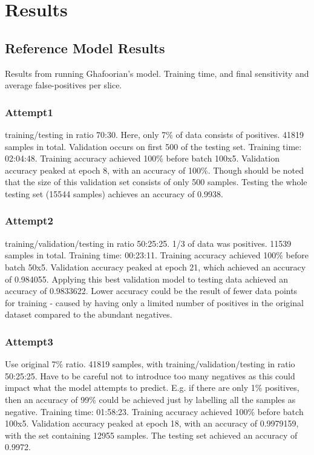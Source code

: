 %
%

\chapter{Results}\label{results}

\citep{AdamsH.H.Hieab2013RMfD}

\section{Reference Model Results}

Results from running Ghafoorian's model. Training time, and final sensitivity and average false-positives per slice.

\subsection*{Attempt1}

training/testing in ratio 70:30. Here, only 7\% of data consists of positives. 41819 samples in total. Validation occurs on first 500 of the testing set. Training time: 02:04:48.
Training accuracy achieved 100\% before batch 100x5. Validation accuracy peaked at epoch 8, with an accuracy of 100\%. Though should be noted that the size of this validation set consists of only 500 samples. Testing the whole testing set (15544 samples) achieves an accuracy of 0.9938.

\subsection*{Attempt2}

training/validation/testing in ratio 50:25:25. 1/3 of data was positives. 11539 samples in total. Training time: 00:23:11.
Training accuracy achieved 100\% before batch 50x5. Validation accuracy peaked at epoch 21, which achieved an accuracy of 0.984055. Applying this best validation model to testing data achieved an accuracy of 0.9833622. Lower accuracy could be the result of fewer data points for training - caused by having only a limited number of positives in the original dataset compared to the abundant negatives.

\subsection*{Attempt3}

Use original 7\% ratio. 41819 samples, with training/validation/testing in ratio 50:25:25. Have to be careful not to introduce too many negatives as this could impact what the model attempts to predict. E.g. if there are only 1\% positives, then an accuracy of 99\% could be achieved just by labelling all the samples as negative. Training time: 01:58:23.
Training accuracy achieved 100\% before batch 100x5. Validation accuracy peaked at epoch 18, with an accuracy of 0.9979159, with the set containing 12955 samples. The testing set achieved an accuracy of 0.9972.

